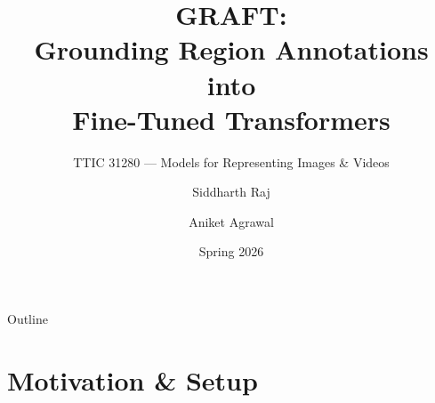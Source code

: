 \documentclass[aspectratio=169,12pt]{beamer}
\title{\textbf{GRAFT}:\\Grounding Region Annotations into\\Fine-Tuned Transformers}
\subtitle{TTIC 31280 — Models for Representing Images \& Videos}
\author{Siddharth Raj \and Aniket Agrawal}
\institute{University of Chicago}
\date{Spring 2026}
\begin{document}
\begin{frame}[plain]
  \maketitle
\end{frame}

\begin{frame}{Outline}
  \tableofcontents
\end{frame}

\section{Motivation \& Setup}
\end{document}
